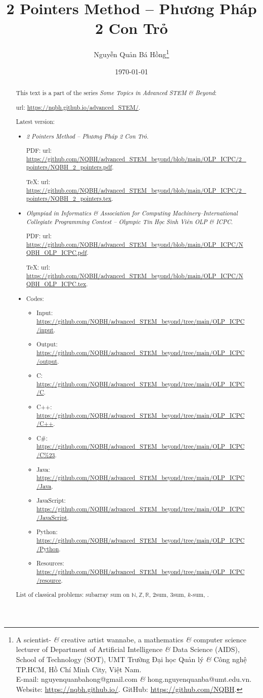\documentclass{article}
\title{2 Pointers Method -- Phương Pháp 2 Con Trỏ}
\author{Nguyễn Quản Bá Hồng\footnote{A scientist- {\it\&} creative artist wannabe, a mathematics {\it\&} computer science lecturer of Department of Artificial Intelligence {\it\&} Data Science (AIDS), School of Technology (SOT), UMT Trường Đại học Quản lý {\it\&} Công nghệ TP.HCM, Hồ Chí Minh City, Việt Nam.\\E-mail: {\sf nguyenquanbahong@gmail.com} {\it\&} {\sf hong.nguyenquanba@umt.edu.vn}. Website: \url{https://nqbh.github.io/}. GitHub: \url{https://github.com/NQBH}.}}
\date{\today}
\begin{document}
\maketitle
\begin{abstract}
    This text is a part of the series {\it Some Topics in Advanced STEM \& Beyond}:

    {\sc url}: \url{https://nqbh.github.io/advanced_STEM/}.

    Latest version:
    \begin{itemize}
        \item {\it 2 Pointers Method -- Phương Pháp 2 Con Trỏ}.

        PDF: {\sc url}: \url{https://github.com/NQBH/advanced_STEM_beyond/blob/main/OLP_ICPC/2_pointers/NQBH_2_pointers.pdf}.

        \TeX: {\sc url}: \url{https://github.com/NQBH/advanced_STEM_beyond/blob/main/OLP_ICPC/2_pointers/NQBH_2_pointers.tex}.
        \item {\it Olympiad in Informatics \& Association for Computing Machinery--International Collegiate Programming Contest -- Olympic Tin Học Sinh Viên OLP \& ICPC}.

        PDF: {\sc url}: \url{https://github.com/NQBH/advanced_STEM_beyond/blob/main/OLP_ICPC/NQBH_OLP_ICPC.pdf}.

        \TeX: {\sc url}: \url{https://github.com/NQBH/advanced_STEM_beyond/blob/main/OLP_ICPC/NQBH_OLP_ICPC.tex}.
        \item Codes:
        \begin{itemize}
            \item Input: \url{https://github.com/NQBH/advanced_STEM_beyond/tree/main/OLP_ICPC/input}.
            \item Output: \url{https://github.com/NQBH/advanced_STEM_beyond/tree/main/OLP_ICPC/output}.
            \item C: \url{https://github.com/NQBH/advanced_STEM_beyond/tree/main/OLP_ICPC/C}.
            \item C++: \url{https://github.com/NQBH/advanced_STEM_beyond/tree/main/OLP_ICPC/C++}.
            \item C\#: \url{https://github.com/NQBH/advanced_STEM_beyond/tree/main/OLP_ICPC/C%23}.
            \item Java: \url{https://github.com/NQBH/advanced_STEM_beyond/tree/main/OLP_ICPC/Java}.
            \item JavaScript: \url{https://github.com/NQBH/advanced_STEM_beyond/tree/main/OLP_ICPC/JavaScript}.
            \item Python: \url{https://github.com/NQBH/advanced_STEM_beyond/tree/main/OLP_ICPC/Python}.
            \item Resources: \url{https://github.com/NQBH/advanced_STEM_beyond/tree/main/OLP_ICPC/resource}.
        \end{itemize}
    \end{itemize}
    List of classical problems: subarray sum on $\mathbb{N},\mathbb{Z},\mathbb{R}$, {\sc2sum}, {\sc3sum}, $k$-sum, .
\end{abstract}
\tableofcontents
\end{document}
